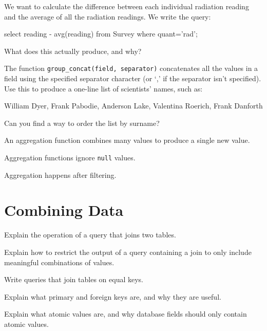 \begin{challenge}
  We want to calculate the difference between each individual radiation
  reading and the average of all the radiation readings. We write the
  query:

\begin{VerbIn}
select reading - avg(reading) from Survey where quant='rad';
\end{VerbIn}

  What does this actually produce, and why?
\end{challenge}

\begin{challenge}
  The function \texttt{group\_concat(field, separator)} concatenates all
  the values in a field using the specified separator character (or `,'
  if the separator isn't specified). Use this to produce a one-line list
  of scientists' names, such as:

\begin{VerbIn}
William Dyer, Frank Pabodie, Anderson Lake, Valentina Roerich, Frank Danforth
\end{VerbIn}

  Can you find a way to order the list by surname?
\end{challenge}

\begin{keypoints}
\begin{swcitemize}
\item
  An aggregation function combines many values to produce a single new
  value.
\item
  Aggregation functions ignore \texttt{null} values.
\item
  Aggregation happens after filtering.
\end{swcitemize}
\end{keypoints}

\section{Combining Data}

\begin{objectives}
\begin{swcitemize}
\item
  Explain the operation of a query that joins two tables.
\item
  Explain how to restrict the output of a query containing a join to
  only include meaningful combinations of values.
\item
  Write queries that join tables on equal keys.
\item
  Explain what primary and foreign keys are, and why they are useful.
\item
  Explain what atomic values are, and why database fields should only
  contain atomic values.
\end{swcitemize}
\end{objectives}

